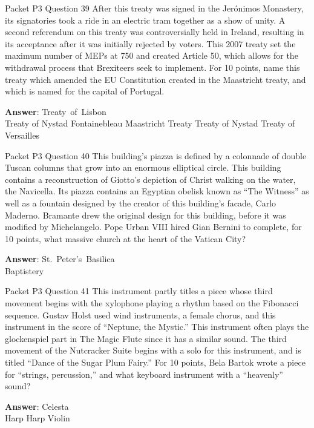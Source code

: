 \begin{frame}{Packet P3 Question 39}
After this treaty was signed in the Jerónimos Monastery, its signatories took a ride in an electric tram   together as a show of unity. A second referendum on this treaty was controversially held in Ireland, resulting in its acceptance after it was initially rejected by voters. This 2007 treaty set the maximum number of MEPs at 750 and created Article 50, which allows for the withdrawal process that Brexiteers seek to implement. For 10 points, name this treaty which amended the EU Constitution created in the Maastricht treaty, and which is named for the capital of Portugal.        

\textbf{Answer}: Treaty\ of\ Lisbon\\
 Treaty of Nystad
 Fontainebleau
 Maastricht Treaty
 Treaty of Nystad
 Treaty of Versailles
\end{frame}

\begin{frame}{Packet P3 Question 40}
This building's piazza   is defined by a colonnade of double Tuscan   columns that grow into an enormous elliptical circle. This building contains a reconstruction of     Giotto's depiction of Christ walking on the water, the Navicella. Its piazza contains an Egyptian obelisk known as ``The Witness'' as well as a fountain designed by the creator of this building's facade, Carlo Maderno. Bramante drew the original design for this building, before it was modified by Michelangelo. Pope Urban   VIII hired Gian Bernini to complete, for 10 points, what massive church at the heart of the Vatican City?

\textbf{Answer}: St.\ Peter's\ Basilica\\
 Baptistery
\end{frame}

\begin{frame}{Packet P3 Question 41}
This instrument partly titles a piece whose third movement begins with the xylophone playing a rhythm based on the Fibonacci sequence. Gustav Holst used wind instruments, a female chorus, and this instrument in the score of ``Neptune, the Mystic.'' This instrument often plays the glockenspiel part in The Magic Flute since it has a similar sound. The third movement of the Nutcracker Suite begins with a solo for this instrument, and is titled ``Dance of the Sugar Plum Fairy.'' For 10 points, Bela Bartok wrote a piece for ``strings,   percussion,''   and what keyboard instrument with a ``heavenly''   sound?    

\textbf{Answer}: Celesta\\
 Harp
 Harp
 Violin
\end{frame}

